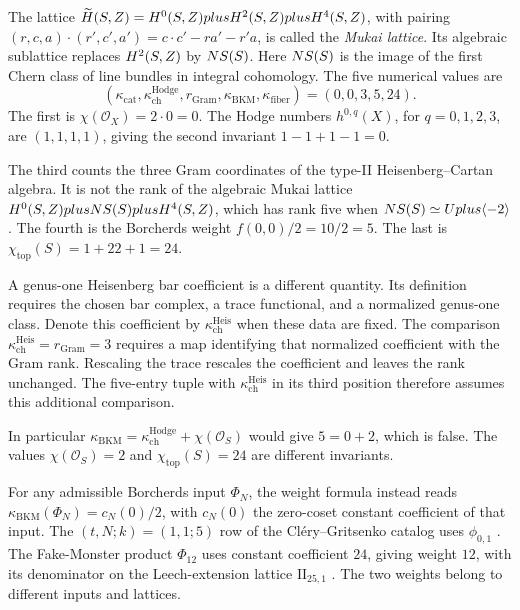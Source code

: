 The lattice
$\widetilde H(S,Z)=H^0(S,Z)plus H^2(S,Z)plus H^4(S,Z)$,
with pairing
$(r,c,a)\cdot(r',c',a')=c\cdot c'-ra'-r'a$,
is called the \emph{Mukai lattice}.
Its algebraic sublattice replaces $H^2(S,Z)$ by $NS(S)$.
Here $NS(S)$ is the image of the first Chern class of line
bundles in integral cohomology.
The five numerical values are
\[
 (\kappa_{\mathrm{cat}},\kappa^{\mathrm{Hodge}}_{\mathrm{ch}},
 r_{\mathrm{Gram}},\kappa_{\mathrm{BKM}},
 \kappa_{\mathrm{fiber}})=(0,0,3,5,24).
\]
The first is \(\chi(\mathcal O_X)=2\cdot0=0\).
The Hodge numbers \(h^{0,q}(X)\), for \(q=0,1,2,3\), are
\((1,1,1,1)\), giving the second invariant \(1-1+1-1=0\).

The third counts the three Gram coordinates of the type-II
Heisenberg--Cartan algebra. It is not the rank of the algebraic
Mukai lattice \(H^0(S,Z)plusNS(S)plus H^4(S,Z)\),
which has rank five when \(NS(S)\simeq Uplus\langle-2\rangle\).
The fourth is the Borcherds weight \(f(0,0)/2=10/2=5\).
The last is \(\chi_{\mathrm{top}}(S)=1+22+1=24\).

A genus-one Heisenberg bar coefficient is a different quantity.
Its definition requires the chosen bar complex, a trace functional,
and a normalized genus-one class. Denote this coefficient by
\(\kappa^{\mathrm{Heis}}_{\mathrm{ch}}\) when these data are fixed.
The comparison \(\kappa^{\mathrm{Heis}}_{\mathrm{ch}}=r_{\mathrm{Gram}}=3\)
requires a map identifying that normalized coefficient with the
Gram rank. Rescaling the trace rescales the coefficient and leaves
the rank unchanged. The five-entry tuple with
\(\kappa^{\mathrm{Heis}}_{\mathrm{ch}}\) in its third position
therefore assumes this additional comparison.


In particular
\(\kappa_{\mathrm{BKM}}=
\kappa^{\mathrm{Hodge}}_{\mathrm{ch}}+\chi(\mathcal O_S)\)
would give \(5=0+2\), which is false. The values
\(\chi(\mathcal O_S)=2\) and \(\chi_{\mathrm{top}}(S)=24\)
are different invariants.

For any admissible Borcherds input
\(\Phi_N\), the weight formula instead reads
\(\kappa_{\mathrm{BKM}}(\Phi_N)=c_N(0)/2\), with \(c_N(0)\)
the zero-coset constant coefficient of that input.
The \((t,N;k)=(1,1;5)\) row of the Cl\'ery--Gritsenko catalog
uses \(\phi_{0,1}\) \cite{GC,GN}. The Fake-Monster product
\(\Phi_{12}\) uses constant coefficient \(24\), giving weight
\(12\), with its denominator on the Leech-extension lattice
\(\mathrm{II}_{25,1}\) \cite{BorcherdsGKM88,Borcherds95}.
The two weights belong to different inputs and lattices.

